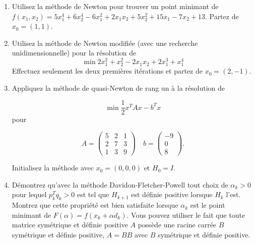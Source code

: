 \begin{enumerate}

  \item Utilisez la méthode de Newton pour trouver un point minimant de $f(x_1, x_2)=5x_1^4+6x_2^4-6x_1^2+2 x_1 x_2 +5x_2^2+15x_1-7x_2+13$.
    Partez de $x_0=(1, 1)$.

    \begin{solution}
    \end{solution}

  \item Utilisez la méthode de Newton modifiée (avec une recherche unidimensionnelle) pour la résolution de
    $$\min 2x_1^2 + x_2^2-2x_1 x_2 + 2 x_1^3 + x_1^4$$
    Effectuez seulement les deux premières
    itérations et partez de $x_0=(2, -1)$.



    \begin{solution}
    \end{solution}

  \item Appliquez la méthode de quasi-Newton de rang un à la résolution de

    $$\min \frac{1}{2} x^TAx-b^Tx$$ pour

  $$A=\left( \begin{array}{rrr} 5 & 2& 1 \\ 2 & 7 & 3 \\ 1 & 3 & 9 \end{array} \right) \quad  b= \left( \begin{array}{c} -9 \\ 0 \\8
    \end{array} \right).$$

    Initialisez la méthode avec $x_0= (0, 0, 0)$ et $H_0 = I$.



    \begin{solution}
    \end{solution}

  \item  Démontrez qu'avec la méthode Davidon-Fletcher-Powell tout  choix
    de $\alpha_k>0$ pour lequel $p_k^T q_k >0$ est tel que $H_{k+1}$ est définie positive lorsque $H_k$ l'est. Montrez que cette propriété est bien
    satisfaite lorsque $\alpha_k$ est le point minimant de $F(\alpha)=f(x_k+ \alpha d_k)$. Vous pouvez utiliser le fait que toute matrice
    symétrique et définie positive $A$ possède une racine carrée $B$ symétrique et définie positive, $A= B B$ avec $B$ symétrique et
    définie positive.


\end{enumerate}
